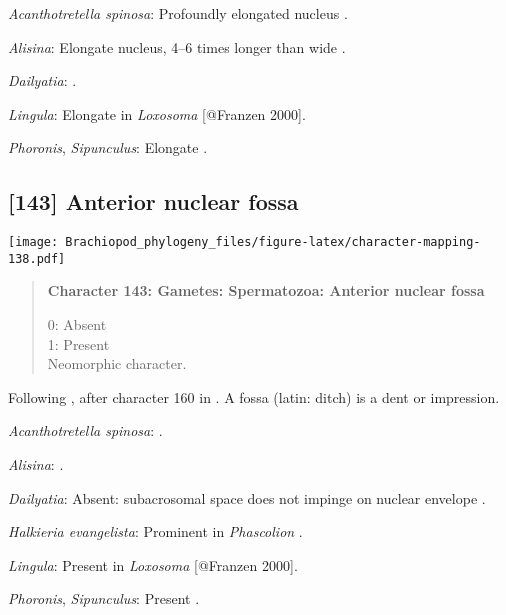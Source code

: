 \documentclass[openany]{book}
\theoremstyle{definition}
\theoremstyle{definition}
\theoremstyle{definition}
\theoremstyle{remark}
\begin{document}
\hypertarget{Acanthotretella_spinosa-coding-142}{}
\emph{Acanthotretella spinosa}: Profoundly elongated nucleus
\citep{BucklandNicks1988}.

\hypertarget{Alisina-coding-142}{}
\emph{Alisina}: Elongate nucleus, 4--6 times longer than wide
\citep{DufresneDube1983}.

\hypertarget{Dailyatia-coding-142}{}
\emph{Dailyatia}: \citet{Gherardi2011}.

\hypertarget{Lingula-coding-142}{}
\emph{Lingula}: Elongate in \emph{Loxosoma} {[}@Franzen 2000{]}.

\hypertarget{Phoronis-coding-142}{}
\emph{Phoronis}, \emph{Sipunculus}: Elongate \citep{Franzen1981}.

\subsection*{{[}143{]} Anterior nuclear
fossa}\label{anterior-nuclear-fossa}

\texttt{[image: Brachiopod\_phylogeny\_files/figure-latex/character-mapping-138.pdf]}

\begin{quote}
\textbf{Character 143: Gametes: Spermatozoa: Anterior nuclear fossa}

0: Absent\\
1: Present\\
Neomorphic character.
\end{quote}

Following \citet{Smith2012}, after character 160 in \citet{Giribet2002}.
A fossa (latin: ditch) is a dent or impression.

\hypertarget{Acanthotretella_spinosa-coding-143}{}
\emph{Acanthotretella spinosa}: \citet{BucklandNicks1988}.

\hypertarget{Alisina-coding-143}{}
\emph{Alisina}: \citet{DufresneDube1983}.

\hypertarget{Dailyatia-coding-143}{}
\emph{Dailyatia}: Absent: subacrosomal space does not impinge on nuclear
envelope \citep{Gherardi2011}.

\hypertarget{Halkieria_evangelista-coding-143}{}
\emph{Halkieria evangelista}: Prominent in \emph{Phascolion}
\citep{Rice1993}.

\hypertarget{Lingula-coding-143}{}
\emph{Lingula}: Present in \emph{Loxosoma} {[}@Franzen 2000{]}.

\hypertarget{Phoronis-coding-143}{}
\emph{Phoronis}, \emph{Sipunculus}: Present \citep[in
\emph{Tubulipora};][]{Franzen1984}.
\end{document}
